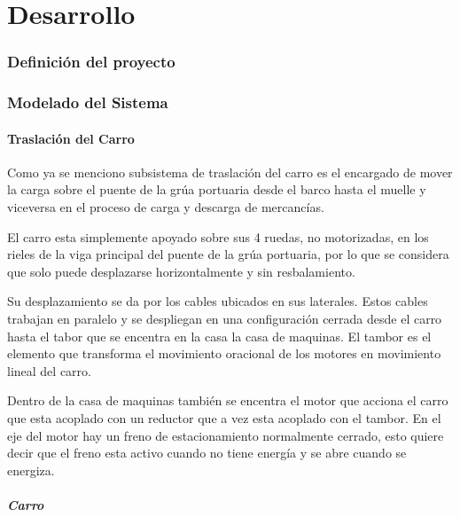 \part*{Desarrollo}


\section{Definición del proyecto}

\lipsum[10]


\section{Modelado del Sistema}


\subsection{Traslación del Carro}

Como ya se menciono subsistema de traslación del carro es el encargado de 
mover la carga sobre el puente de la grúa portuaria desde el barco hasta 
el muelle y viceversa en el proceso de carga y descarga de mercancías.

El carro esta simplemente apoyado sobre sus 4 ruedas, no motorizadas, en 
los rieles de la viga principal del puente de la grúa portuaria, 
por lo que se considera que solo puede desplazarse horizontalmente y 
sin resbalamiento.

Su desplazamiento se da por los cables ubicados en sus laterales. Estos
cables trabajan en paralelo y se despliegan en una configuración cerrada
desde el carro hasta el tabor que se encentra en la casa la 
casa de maquinas. El tambor es el elemento que transforma el movimiento
oracional de los motores en movimiento lineal del carro.

Dentro de la casa de maquinas también se encentra el motor que acciona el
carro que esta acoplado con un reductor que a vez esta acoplado con el tambor.
En el eje del motor hay un freno de estacionamiento normalmente cerrado, esto
quiere decir que el freno esta activo cuando no tiene energía y se abre
cuando se energiza.

\subsubsection{Carro}

